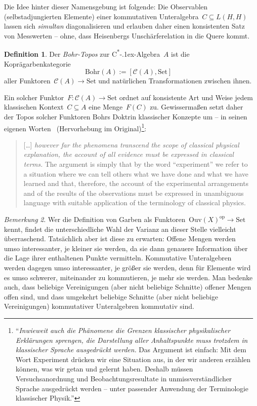 \documentclass[a4paper,ngerman,12pt]{scrartcl}
\theoremstyle{definition}
\newtheorem{defn}{Definition}[section]
\theoremstyle{plain}
\theoremstyle{remark}
\newtheorem{bem}[defn]{Bemerkung}
\newcommand{\C}{\mathcal{C}}
\newcommand{\Ouv}{\mathrm{Ouv}}
\newcommand{\Bohr}{\mathrm{Bohr}}
\newcommand{\csalgebra}{C\textsuperscript{*}\kern-.1ex-Algebra}
\newcommand{\op}{\mathrm{op}}
\newcommand{\Set}{\mathrm{Set}}
\renewcommand{\_}{\mathpunct{.}\,}
\newcommand{\?}{\,{:}\,}
\begin{document}
Die Idee hinter dieser Namensgebung ist folgende: Die Observablen
(selbstadjungierten Elemente) einer kommutativen Unteralgebra~$C \subseteq
L(H,H)$ lassen sich \emph{simultan} diagonalisieren und erlauben daher einen
konsistenten Satz von Messwerten -- ohne, dass Heisenbergs Unschärferelation in
die Quere kommt.

\begin{defn}Der \emph{Bohr-Topos} zur \csalgebra~$A$ ist die Koprägarbenkategorie
\[ \Bohr(A) := [\C(A), \Set] \]
aller Funktoren~$\C(A) \to \Set$ und natürlichen Transformationen zwischen
ihnen.\end{defn}

Ein solcher Funktor~$F : \C(A) \to \Set$ ordnet auf konsistente Art und Weise
jedem klassischen Kontext~$C \subseteq A$ eine Menge~$F(C)$ zu. Gewissermaßen
setzt daher der Topos solcher Funktoren Bohrs Doktrin klassischer Konzepte um
-- in seinen eigenen Worten~\cite[Seite~209]{bohr} (Hervorhebung im
Original)\footnote{"`\emph{Inwieweit auch
die Phänomene die Grenzen klassischer physikalischer
Erklärungen sprengen, die Darstellung aller Anhaltspunkte muss trotzdem
in klassischer Sprache ausgedrückt werden.} Das Argument ist einfach:
Mit dem Wort \glq Experiment\grq{} drücken wir eine Situation aus, in der wir
anderen erzählen können, was wir getan und gelernt haben. Deshalb müssen
Versuchsanordnung und Beobachtungsresultate in
unmissverständlicher Sprache ausgedrückt werden -- unter passender
Anwendung der Terminologie klassischer Physik."'}:
\begin{quote}
[\ldots] \emph{however far the phenomena transcend the scope of classical physical
explanation, the account of all evidence must be expressed in
classical terms.} The argument is simply that by the word ``experiment''
we refer to a situation where we can tell others what we
have done and what we have learned and that, therefore, the account of
the experimental arrangements and of the results of the observations
must be expressed in unambiguous language with suitable application of
the terminology of classical physics.
\end{quote}

\begin{bem}Wer die Definition von Garben als Funktoren~$\Ouv(X)^\op \to \Set$
kennt, findet die unterschiedliche Wahl der Varianz an dieser Stelle vielleicht
überraschend. Tatsächlich aber ist diese zu erwarten: Offene Mengen werden umso
interessanter, je kleiner sie werden, da sie dann genauere Information über die
Lage ihrer enthaltenen Punkte vermitteln. Kommutative Unteralgebren werden
dagegen umso interessanter, je größer sie werden, denn für Elemente wird
es umso schwerer, miteinander zu kommutieren, je mehr sie werden. Man bedenke auch, dass
beliebige Vereinigungen (aber nicht beliebige Schnitte) offener Mengen offen
sind, und dass umgekehrt beliebige Schnitte (aber nicht beliebige
Vereinigungen) kommutativer Unteralgebren kommutativ sind.\end{bem}
\end{document}
